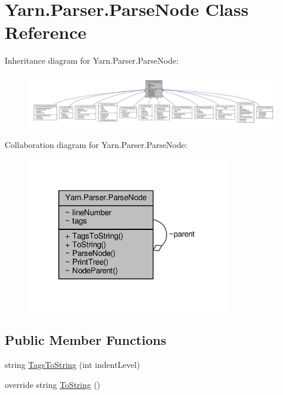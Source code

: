 \hypertarget{a00150}{\section{Yarn.\-Parser.\-Parse\-Node Class Reference}
\label{a00150}
}


Inheritance diagram for Yarn.\-Parser.\-Parse\-Node\-:
\nopagebreak
\begin{figure}[H]
\begin{center}
\leavevmode
\includegraphics[width=350pt]{a00700}
\end{center}
\end{figure}


Collaboration diagram for Yarn.\-Parser.\-Parse\-Node\-:
\nopagebreak
\begin{figure}[H]
\begin{center}
\leavevmode
\includegraphics[width=254pt]{a00701}
\end{center}
\end{figure}
\subsection*{Public Member Functions}
\begin{DoxyCompactItemize}
\item 
string \hyperlink{a00150_a054f36c80d5eeacd569a8859f599af67}{Tags\-To\-String} (int indent\-Level)
\item 
override string \hyperlink{a00150_a18c67cb16090d0889bb9d6c8c6c565f8}{To\-String} ()
\end{DoxyCompactItemize}
